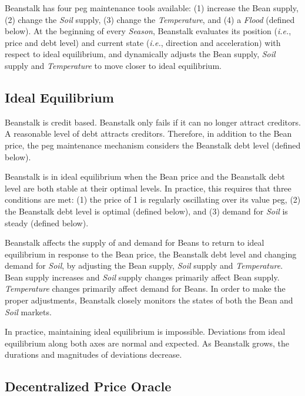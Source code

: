 \documentclass[tikz]{article}
\newcommand{\term}[1]{\textsl{#1}}
\newcommand{\Bean}{} %
\begin{document}
Beanstalk has four peg maintenance tools available: (1) increase the Bean supply, (2) change the \term{Soil} supply, (3) change the \term{Temperature}, and (4) a \term{Flood} (defined below). At the beginning of every \term{Season}, Beanstalk evaluates its position (\term{i.e.}, price and debt level) and current state (\term{i.e.}, direction and acceleration) with respect to ideal equilibrium, and dynamically adjusts the Bean supply, \term{Soil} supply and \term{Temperature} to move closer to ideal equilibrium.

\vspace*{-3mm}
\subsection{Ideal Equilibrium}
\vspace*{-1mm}
Beanstalk is credit based. Beanstalk only fails if it can no longer attract creditors. A reasonable level of debt attracts creditors. Therefore, in addition to the Bean price, the peg maintenance mechanism considers the Beanstalk debt level (defined below). 

Beanstalk is in ideal equilibrium when the Bean price and the Beanstalk debt level are both stable at their optimal levels. In practice, this requires that three conditions are met: (1) the price of \Bean1 is regularly oscillating over its value peg, (2) the Beanstalk debt level is optimal (defined below), and (3) demand for \term{Soil} is steady (defined below). 

Beanstalk affects the supply of and demand for Beans to return to ideal equilibrium in response to the Bean price, the Beanstalk debt level and changing demand for \term{Soil}, by adjusting the Bean supply, \term{Soil} supply and \term{Temperature}. Bean supply increases and \term{Soil} supply changes primarily affect Bean supply. \term{Temperature} changes primarily affect demand for Beans. In order to make the proper adjustments, Beanstalk closely monitors the states of both the Bean and \term{Soil} markets.

In practice, maintaining ideal equilibrium is impossible. Deviations from ideal equilibrium along both axes are normal and expected. As Beanstalk grows, the durations and magnitudes of deviations decrease. 

\vspace*{-1mm}
\subsection{Decentralized Price Oracle}
\vspace*{-1mm}
\end{document}
